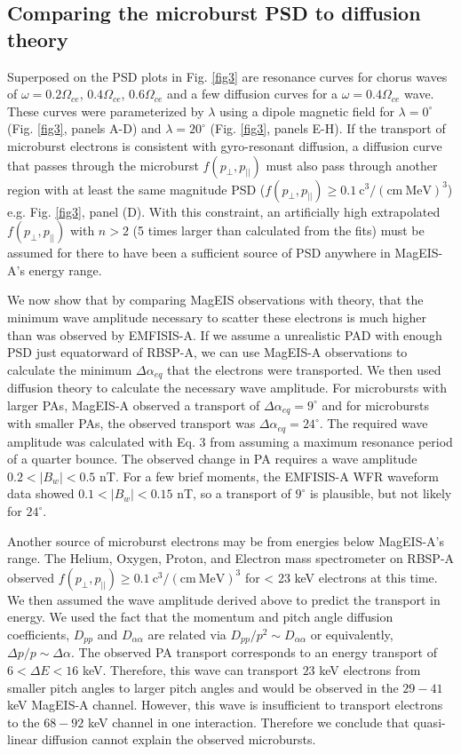 \subsection{Comparing the microburst PSD to diffusion theory} \label{compare_section}
Superposed on the PSD plots in Fig. \ref{fig3} are resonance curves for chorus waves of $\omega = 0.2 \Omega_{ce}$, $0.4 \Omega_{ce}$, $0.6 \Omega_{ce}$ and a few diffusion curves for a $\omega = 0.4 \Omega_{ce}$ wave. These curves were parameterized by $\lambda$ using a dipole magnetic field for $\lambda = 0^\circ$ (Fig. \ref{fig3}, panels A-D) and $\lambda = 20^\circ$ (Fig. \ref{fig3}, panels E-H). If the transport of microburst electrons is consistent with gyro-resonant diffusion, a diffusion curve that passes through the microburst $f(p_\perp, p_{||})$ must also pass through another region with at least the same magnitude PSD ($f(p_\perp, p_{||}) \geq 0.1 \ \mathrm{c^3/(cm \ MeV)^3}$) e.g. Fig. \ref{fig3}, panel (D). With this constraint, an artificially high extrapolated $f(p_\perp, p_{||})$ with $n > 2$ (5 times larger than calculated from the fits) must be assumed for there to have been a sufficient source of PSD anywhere in MagEIS-A's energy range. 

We now show that by comparing MagEIS observations with theory, that the minimum wave amplitude necessary to scatter these electrons is much higher than was observed by EMFISIS-A. If we assume a unrealistic PAD with enough PSD just equatorward of RBSP-A, we can use MagEIS-A observations to calculate the minimum $\Delta \alpha_{eq}$ that the electrons were transported. We then used diffusion theory to calculate the necessary wave amplitude. For microbursts with larger PAs, MagEIS-A observed a transport of $\Delta \alpha_{eq} = 9^\circ$ and for microbursts with smaller PAs, the observed transport was $\Delta \alpha_{eq} = 24^\circ$. The required wave amplitude was calculated with Eq. 3 from \citet{Thorne1980} assuming a maximum resonance period of a quarter bounce. The observed change in PA requires a wave amplitude $0.2 < |B_w| < 0.5$ nT. For a few brief moments, the EMFISIS-A WFR waveform data showed $0.1 < |B_w| < 0.15$ nT, so a transport of $9^\circ$ is plausible, but not likely for $24^\circ$.

Another source of microburst electrons may be from energies below MagEIS-A's range. The Helium, Oxygen, Proton, and Electron mass spectrometer \citep{Funsten2013} on RBSP-A observed $f(p_\perp, p_{||}) \geq 0.1 \ \mathrm{c^3/(cm \ MeV)^3}$ for < 23 keV electrons at this time. We then assumed the wave amplitude derived above to predict the transport in energy. We used the fact that the momentum and pitch angle diffusion coefficients, $D_{pp}$ and $D_{\alpha \alpha}$ are related via $D_{pp}/p^2 \sim D_{\alpha \alpha}$ or equivalently, $\Delta p/p \sim \Delta \alpha$. The observed PA transport corresponds to an energy transport of $6 < \Delta E < 16$ keV. Therefore, this wave can transport $23$ keV electrons from smaller pitch angles to larger pitch angles and would be observed in the $29-41$ keV MagEIS-A channel. However, this wave is insufficient to transport electrons to the $68-92$ keV channel in one interaction. Therefore we conclude that quasi-linear diffusion cannot explain the observed microbursts.

